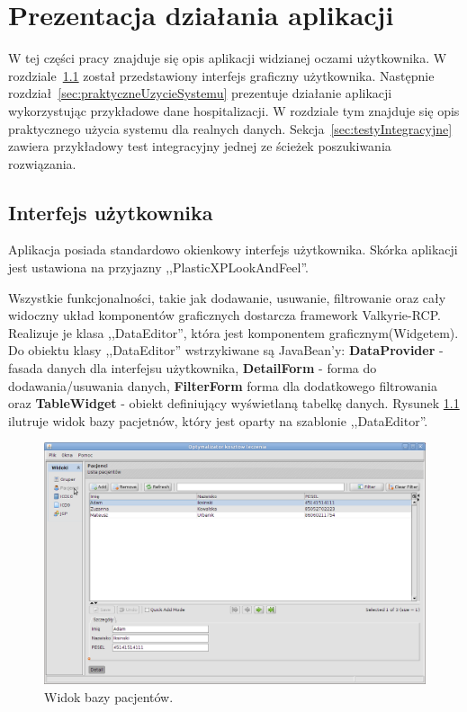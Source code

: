 \chapter{Prezentacja działania aplikacji}
\label{cha:prezentacja}

W tej części pracy znajduje się opis aplikacji widzianej oczami użytkownika. W rozdziale~\ref{sec:interfejsUzytkownika} został
przedstawiony interfejs graficzny użytkownika. Następnie rozdział~\ref{sec:praktyczneUzycieSystemu} prezentuje działanie aplikacji wykorzystując przykładowe dane hospitalizacji. W rozdziale tym znajduje się opis praktycznego użycia systemu dla realnych danych. Sekcja~\ref{sec:testyIntegracyjne} zawiera przykładowy test integracyjny jednej ze ścieżek poszukiwania rozwiązania.


\section{Interfejs użytkownika}
\label{sec:interfejsUzytkownika}
Aplikacja posiada standardowo okienkowy interfejs użytkownika. Skórka aplikacji jest ustawiona na przyjazny ,,PlasticXPLookAndFeel''.

Wszystkie funkcjonalności, takie jak dodawanie, usuwanie, filtrowanie oraz cały widoczny układ komponentów graficznych dostarcza framework Valkyrie-RCP. Realizuje je klasa ,,DataEditor'', która jest komponentem graficznym(Widgetem). Do obiektu klasy ,,DataEditor'' wstrzykiwane są JavaBean'y: \textbf{DataProvider} - fasada danych dla interfejsu użytkownika, \textbf{DetailForm} - forma do dodawania/usuwania danych, \textbf{FilterForm} forma dla dodatkowego filtrowania oraz \textbf{TableWidget} - obiekt definiujący wyświetlaną tabelkę danych\cite{valkyrie_reference}.
Rysunek \ref{img:patient} ilutruje widok bazy pacjetnów, który jest oparty na szablonie ,,DataEditor''.

\begin{figure}[!ht]
\centering
\includegraphics[scale=0.4]{images/patient} 
\caption[Widok bazy pacjentów]{Widok bazy pacjentów.}
\label{img:patient}
\end{figure}

